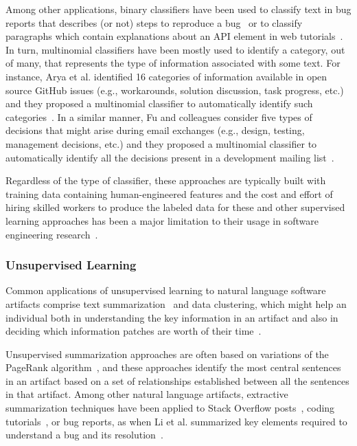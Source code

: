 Among other applications, binary classifiers have been used 
to classify text in bug reports that describes (or not) steps to reproduce a bug~\cite{Chaparro2016}
or  to classify paragraphs which contain explanations 
about an API element in web tutorials~\cite{Petrosyan2015}.
In turn, multinomial classifiers have been mostly used 
to identify a category, out of many, that represents the type of information 
associated with some text. For instance, Arya et al. identified 16 categories of  information available
in open source GitHub issues (e.g., workarounds, solution discussion, task progress, etc.)
and they proposed a multinomial classifier 
to automatically identify such categories~\cite{Arya2019}.
In a similar manner, Fu and colleagues consider 
five types of decisions that might arise during 
email exchanges (e.g., design, testing, management decisions, etc.)
and they proposed a multinomial classifier 
to automatically identify all the decisions present in 
a development mailing list~\cite{fu2021}.





Regardless of the type of classifier, these approaches are typically built 
with training data containing human-engineered features and the cost and effort of hiring skilled workers to produce 
the labeled data for these and other supervised learning approaches
has been a major limitation to their usage in software engineering research~\cite{Arpteg2018, ferreira2021}.




\subsubsection{Unsupervised Learning}
\label{cp2:unsupervised}



Common applications of unsupervised learning 
to natural language software artifacts 
comprise text summarization~\cite{Goldsteinet1999} and data clustering, which might help an individual both in understanding the key information in an 
artifact and also in deciding which information patches are 
 worth of their time~\cite{Lotufo2012}.


Unsupervised summarization approaches are often based on 
variations of the PageRank algorithm~\cite{Page1999}, and these approaches identify
the most central sentences in an artifact based on a set of relationships
established between all the sentences in that artifact.
Among other natural language artifacts,
extractive summarization techniques
have been applied to Stack Overflow posts~\cite{Ponzanelli2015},
coding tutorials~\cite{Li2018},
or bug reports, as
when Li et al. summarized 
key elements required to understand a bug and its resolution~\cite{li2018deep}.




